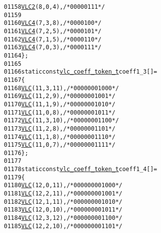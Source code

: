 \begin{footnotesize}
\begin{alltt}
01158         \hyperlink{vlc_8h_ad3cda36b9c6132357c7f7de5e52a6c93}{VLC2}(8, 0, 4),   \textcolor{comment}{/* 0000 0111 */}
01159 
01160         \hyperlink{vlc_8h_a02cdc921d8f03450b12879e8afb222cb}{VLC4}(7, 3, 8),    \textcolor{comment}{/* 0000 100 */}
01161         \hyperlink{vlc_8h_a02cdc921d8f03450b12879e8afb222cb}{VLC4}(7, 2, 5),    \textcolor{comment}{/* 0000 101 */}
01162         \hyperlink{vlc_8h_a02cdc921d8f03450b12879e8afb222cb}{VLC4}(7, 1, 5),    \textcolor{comment}{/* 0000 110 */}
01163         \hyperlink{vlc_8h_a02cdc921d8f03450b12879e8afb222cb}{VLC4}(7, 0, 3),    \textcolor{comment}{/* 0000 111 */}
01164 \};
01165 
01166 \textcolor{keyword}{static} \textcolor{keyword}{const} \hyperlink{structvlc__coeff__token__t}{vlc_coeff_token_t} coeff1\_3[] = 
01167 \{
01168         \hyperlink{vlc_8h_a7f3572774a720fd9b4bc3b1a0b65082f}{VLC}(11, 3, 11),   \textcolor{comment}{/* 0000 0001 000 */}
01169         \hyperlink{vlc_8h_a7f3572774a720fd9b4bc3b1a0b65082f}{VLC}(11, 2, 9),    \textcolor{comment}{/* 0000 0001 001 */}
01170         \hyperlink{vlc_8h_a7f3572774a720fd9b4bc3b1a0b65082f}{VLC}(11, 1, 9),    \textcolor{comment}{/* 0000 0001 010 */}
01171         \hyperlink{vlc_8h_a7f3572774a720fd9b4bc3b1a0b65082f}{VLC}(11, 0, 8),    \textcolor{comment}{/* 0000 0001 011 */}
01172         \hyperlink{vlc_8h_a7f3572774a720fd9b4bc3b1a0b65082f}{VLC}(11, 3, 10),   \textcolor{comment}{/* 0000 0001 100 */}
01173         \hyperlink{vlc_8h_a7f3572774a720fd9b4bc3b1a0b65082f}{VLC}(11, 2, 8),    \textcolor{comment}{/* 0000 0001 101 */}
01174         \hyperlink{vlc_8h_a7f3572774a720fd9b4bc3b1a0b65082f}{VLC}(11, 1, 8),    \textcolor{comment}{/* 0000 0001 110 */}
01175         \hyperlink{vlc_8h_a7f3572774a720fd9b4bc3b1a0b65082f}{VLC}(11, 0, 7),    \textcolor{comment}{/* 0000 0001 111 */}
01176 \};
01177 
01178 \textcolor{keyword}{static} \textcolor{keyword}{const} \hyperlink{structvlc__coeff__token__t}{vlc_coeff_token_t} coeff1\_4[] = 
01179 \{
01180         \hyperlink{vlc_8h_a7f3572774a720fd9b4bc3b1a0b65082f}{VLC}(12, 0, 11),   \textcolor{comment}{/* 0000 0000 1000 */}
01181         \hyperlink{vlc_8h_a7f3572774a720fd9b4bc3b1a0b65082f}{VLC}(12, 2, 11),   \textcolor{comment}{/* 0000 0000 1001 */}
01182         \hyperlink{vlc_8h_a7f3572774a720fd9b4bc3b1a0b65082f}{VLC}(12, 1, 11),   \textcolor{comment}{/* 0000 0000 1010 */}
01183         \hyperlink{vlc_8h_a7f3572774a720fd9b4bc3b1a0b65082f}{VLC}(12, 0, 10),   \textcolor{comment}{/* 0000 0000 1011 */}
01184         \hyperlink{vlc_8h_a7f3572774a720fd9b4bc3b1a0b65082f}{VLC}(12, 3, 12),   \textcolor{comment}{/* 0000 0000 1100 */}
01185         \hyperlink{vlc_8h_a7f3572774a720fd9b4bc3b1a0b65082f}{VLC}(12, 2, 10),   \textcolor{comment}{/* 0000 0000 1101 */}

\end{alltt}
\end{footnotesize}
